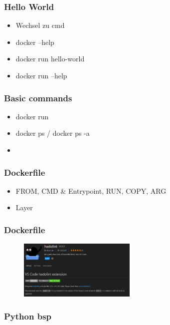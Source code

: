 \documentclass[22pt,handout]{beamer}
\begin{document}
\begin{frame}[t]
    \frametitle{Hello World}
    \begin{itemize}
        \item Wechsel zu cmd
        \item docker --help
        \item docker run hello-world
        \item docker run --help
    \end{itemize} 
\end{frame}

\begin{frame}[t]
    \frametitle{Basic commands}
    \begin{itemize}
        \item docker run
        \item docker ps / docker ps -a
        \item 
    \end{itemize} 
\end{frame}

\begin{frame}[t]
    \frametitle{Dockerfile}
    \begin{itemize}
        \item FROM, CMD \& Entrypoint, RUN, COPY, ARG
        \item Layer
    \end{itemize} 
\end{frame}

\begin{frame}[t]
    \frametitle{Dockerfile}
    \begin{figure}[h]
        \centering
        \includegraphics[width=0.5\textwidth]{Bilder/Hadolint.png}
        \caption{}
    \end{figure}
\end{frame}



\begin{frame}[fragile]
    \frametitle{Python bsp}
    \inputminted[fontsize=\footnotesize, frame=lines]{dockerfile}{../examples/Dockerfile.cmd}
\end{frame}
\end{document}
